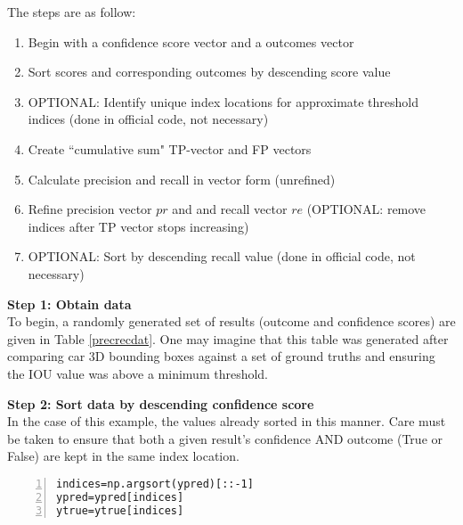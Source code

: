The steps are as follow:
\begin{enumerate}\itemsep=-0.5em
    \item Begin with a confidence score vector and a outcomes vector
    \item Sort scores and corresponding outcomes by descending score value
    \item OPTIONAL: Identify unique index locations for approximate threshold indices (done in official code, not necessary)
    \item Create ``cumulative sum" TP-vector and FP vectors
    \item Calculate precision and recall in vector form (unrefined)
    \item Refine precision vector $pr$ and and recall vector $re$ (OPTIONAL: remove indices after TP vector stops increasing)
    \item OPTIONAL: Sort by descending recall value (done in official code, not necessary)
\end{enumerate}

\textbf{{\large Step 1: Obtain data}} \\
To begin, a randomly generated set of results (outcome and confidence scores) are given in Table \ref{precrecdat}. One may imagine that this table was generated after comparing car 3D bounding boxes against a set of ground truths and ensuring the IOU value was above a minimum threshold.

\textbf{{\large Step 2: Sort data by descending confidence score}} \\
In the case of this example, the values already sorted in this manner. Care must be taken to ensure that both a given result's confidence AND outcome (True or False) are kept in the same index location.
\begin{lstlisting}[numbers=left]
indices=np.argsort(ypred)[::-1]
ypred=ypred[indices]
ytrue=ytrue[indices]
\end{lstlisting}

